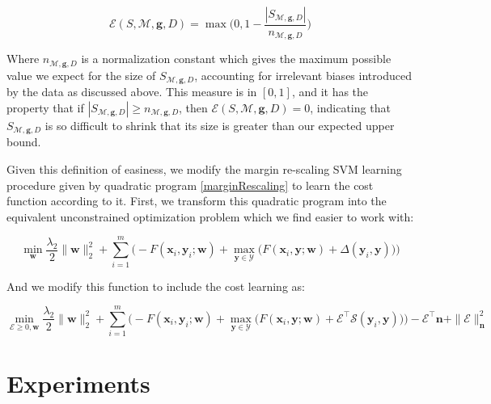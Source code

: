 \documentclass{article} %
\begin{document}
\begin{equation}
\mathcal{E}(S,\mathcal{M},\mathbf{g},D)=\max\bigg(0, 1-\frac{|S_{\mathcal{M},\mathbf{g},D}|}{n_{\mathcal{M},\mathbf{g},D}}\bigg)
\end{equation}

Where $n_{\mathcal{M},\mathbf{g},D}$ is a normalization constant which
gives the maximum possible value we expect for the size of 
$S_{\mathcal{M},\mathbf{g},D}$, accounting for irrelevant biases
introduced by the data as discussed above.  This measure is in
$[0,1]$, and it has the property that if 
$|S_{\mathcal{M},\mathbf{g},D}|\geq n_{\mathcal{M},\mathbf{g},D}$,
then $\mathcal{E}(S,\mathcal{M},\mathbf{g},D)=0$, indicating that
$S_{\mathcal{M},\mathbf{g},D}$ is so difficult to shrink that its
size is greater than our expected upper bound.

Given this definition of easiness, we modify the 
margin re-scaling SVM learning procedure given by quadratic program \ref{marginRescaling} to learn the cost function according to it.  
First, we transform this quadratic program
into the equivalent unconstrained optimization problem which we find 
easier to work with:

\begin{equation}
\label{svmObjective}
\min_{\mathbf{w}} \frac{\lambda_2}{2}\|\mathbf{w}\|_2^2 + \sum_{i=1}^m\bigg(-F(\mathbf{x}_i,\mathbf{y}_i;\mathbf{w})+\max_{\mathbf{y}\in \mathcal{Y}}\Big(F(\mathbf{x}_i,\mathbf{y};\mathbf{w})+\Delta(\mathbf{y}_i,\mathbf{y})\Big)\bigg)
\end{equation}

And we modify this function to include the cost learning as:

\begin{equation}
\label{costObjective}
\min_{\mathbf{\mathcal{E}}\geq 0,\mathbf{w}} \frac{\lambda_2}{2}\|\mathbf{w}\|_2^2 + \sum_{i=1}^m\bigg(-F(\mathbf{x}_i,\mathbf{y}_i;\mathbf{w})+\max_{\mathbf{y}\in \mathcal{Y}}\Big(F(\mathbf{x}_i,\mathbf{y};\mathbf{w})+\mathbf{\mathcal{E}}^\top \mathbf{\mathcal{S}}(\mathbf{y}_i,\mathbf{y})\Big)\bigg)-\mathbf{\mathcal{E}}^\top\mathbf{n}+\|\mathcal{E}\|^2_\mathbf{n}
\end{equation}


\section{Experiments}
\end{document}
